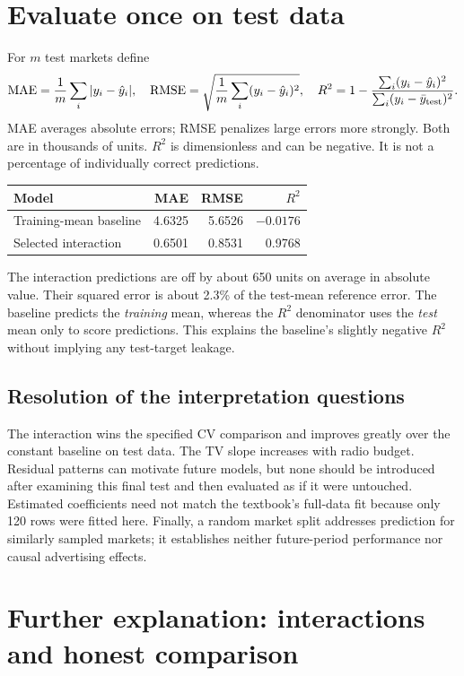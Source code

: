 \section{Evaluate once on test data}
For $m$ test markets define
\[
\operatorname{MAE}=\frac1m\sum_i|y_i-\hat y_i|,\quad
\operatorname{RMSE}=\sqrt{\frac1m\sum_i(y_i-\hat y_i)^2},\quad
R^2=1-\frac{\sum_i(y_i-\hat y_i)^2}{\sum_i(y_i-\bar y_{\rm test})^2}.
\]
MAE averages absolute errors; RMSE penalizes large errors more strongly. Both are in thousands of units. $R^2$ is dimensionless and can be negative. It is not a percentage of individually correct predictions.
\begin{center}
\begin{tabular}{lrrr}\toprule
Model&MAE&RMSE&$R^2$\\\midrule
Training-mean baseline&4.6325&5.6526&$-0.0176$\\
Selected interaction&0.6501&0.8531&0.9768\\\bottomrule
\end{tabular}
\end{center}
The interaction predictions are off by about 650 units on average in absolute value. Their squared error is about 2.3\% of the test-mean reference error. The baseline predicts the \emph{training} mean, whereas the $R^2$ denominator uses the \emph{test} mean only to score predictions. This explains the baseline's slightly negative $R^2$ without implying any test-target leakage.

\subsection*{Resolution of the interpretation questions}
The interaction wins the specified CV comparison and improves greatly over the constant baseline on test data. The TV slope increases with radio budget. Residual patterns can motivate future models, but none should be introduced after examining this final test and then evaluated as if it were untouched. Estimated coefficients need not match the textbook's full-data fit because only 120 rows were fitted here. Finally, a random market split addresses prediction for similarly sampled markets; it establishes neither future-period performance nor causal advertising effects.

\section*{Further explanation: interactions and honest comparison}
